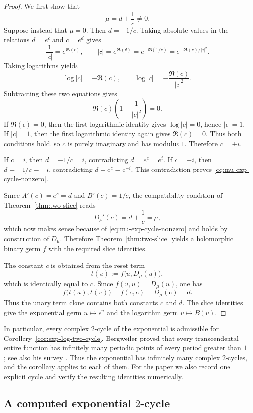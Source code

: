 \documentclass[11pt]{amsart}
\numberwithin{equation}{section}
\theoremstyle{remark}
\theoremstyle{definition}
\begin{document}
\begin{proof}
We first show that
\begin{equation}\label{eq:mu-exp-cycle-nonzero}
\mu=d+\frac{1}{c}\neq 0.
\end{equation}
Suppose instead that $\mu=0$. Then $d=-1/c$. Taking absolute values in the relations $d=e^c$ and $c=e^d$ gives
\[
\frac{1}{|c|}=e^{\Re(c)},
\qquad
|c|=e^{\Re(d)}=e^{-\Re(1/c)}=e^{-\Re(c)/|c|^2}.
\]
Taking logarithms yields
\[
\log|c|=-\Re(c),
\qquad
\log|c|=-\frac{\Re(c)}{|c|^2}.
\]
Subtracting these two equations gives
\[
\Re(c)\left(1-\frac{1}{|c|^2}\right)=0.
\]
If $\Re(c)=0$, then the first logarithmic identity gives $\log|c|=0$, hence $|c|=1$. If $|c|=1$, then the first logarithmic identity again gives $\Re(c)=0$. Thus both conditions hold, so $c$ is purely imaginary and has modulus $1$. Therefore $c=\pm i$.

If $c=i$, then $d=-1/c=i$, contradicting $d=e^c=e^i$. If $c=-i$, then $d=-1/c=-i$, contradicting $d=e^c=e^{-i}$. This contradiction proves \eqref{eq:mu-exp-cycle-nonzero}.

Since $A'(c)=e^c=d$ and $B'(c)=1/c$, the compatibility condition of Theorem~\ref{thm:two-slice} reads
\[
D_\mu'(c)=d+\frac{1}{c}=\mu,
\]
which now makes sense because of \eqref{eq:mu-exp-cycle-nonzero} and holds by construction of $D_\mu$. Therefore Theorem~\ref{thm:two-slice} yields a holomorphic binary germ $f$ with the required slice identities.

The constant $c$ is obtained from the reset term
\[
t(u):=f\bigl(u,D_\mu(u)\bigr),
\]
which is identically equal to $c$. Since $f(u,u)=D_\mu(u)$, one has
\[
f\bigl(t(u),t(u)\bigr)=f(c,c)=D_\mu(c)=d.
\]
Thus the unary term clone contains both constants $c$ and $d$. The slice identities give the exponential germ $u\mapsto e^u$ and the logarithm germ $v\mapsto B(v)$.
\end{proof}

In particular, every complex $2$-cycle of the exponential is admissible for Corollary~\ref{cor:exp-log-two-cycle}. Bergweiler proved that every transcendental entire function has infinitely many periodic points of every period greater than $1$ \cite{Bergweiler1991}; see also his survey \cite{Bergweiler1993}. Thus the exponential has infinitely many complex $2$-cycles, and the corollary applies to each of them. For the paper we also record one explicit cycle and verify the resulting identities numerically.

\subsection*{A computed exponential $2$-cycle}
\end{document}

